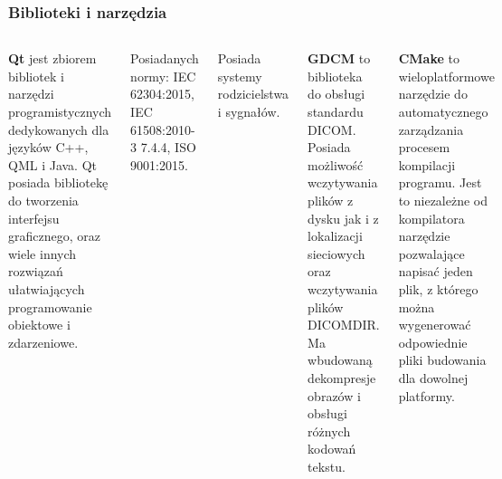 \documentclass[aspectratio=169]{beamer}
\begin{document}
\begin{frame}[t]
    \frametitle{Biblioteki i narzędzia}

    \begin{columns}[t]
        \textbf{\LARGE Qt}
        \scriptsize
        jest zbiorem bibliotek i narzędzi programistycznych dedykowanych dla języków C++, QML i Java.
        Qt posiada bibliotekę do tworzenia interfejsu graficznego, oraz wiele innych rozwiązań ułatwiających programowanie obiektowe i zdarzeniowe.

        Posiadanych normy: IEC 62304:2015, IEC 61508:2010-3 7.4.4, ISO 9001:2015.

        Posiada systemy rodzicielstwa i sygnałów.

        \textbf{\LARGE GDCM}
        \scriptsize
        to biblioteka do obsługi standardu DICOM.
        Posiada możliwość wczytywania plików z dysku jak i z lokalizacji sieciowych oraz wczytywania plików DICOMDIR.
        Ma wbudowaną dekompresje obrazów i obsługi różnych kodowań tekstu.

        \textbf{\LARGE CMake}
        \scriptsize
        to wieloplatformowe narzędzie do automatycznego zarządzania procesem kompilacji programu.
        Jest to niezależne od kompilatora narzędzie pozwalające napisać jeden plik, z którego można wygenerować odpowiednie pliki budowania dla dowolnej platformy.

    \end{columns}






\end{frame}
\end{document}
